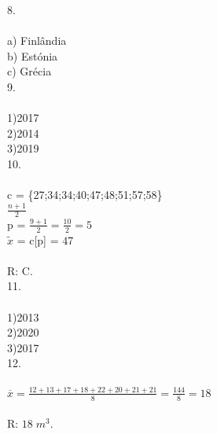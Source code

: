 \documentclass[12pt]{article}
\begin{document}
8.\\\\
a) Finlândia\\
b) Estónia\\
c) Grécia\\

9.\\\\
1)2017\\
2)2014\\
3)2019\\

10.\\\\
c = \{27;34;34;40;47;48;51;57;58\}\\
$\frac{n+1}{2}$\\
p = $\frac{9+1}{2}=\frac{10}{2}=5$\\
$\tilde{x}$ = c[p] = $47$\\\\
R: C.\\

11.\\\\
1)2013\\
2)2020\\
3)2017\\

12.\\\\
$\overline{x}=\frac{12+13+17+18+22+20+21+21}{8}=\frac{144}{8}=18$\\\\
R: $18\;m^3$.\\
\end{document}
